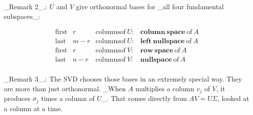_Remark 2_.: \(U\) and \(V\) give orthonormal bases for _all four fundamental subspaces_:

\[\begin{array}{llll}\mathrm{first}&r&\mathrm{columns of}\ U\mathrm{:}& \mathbf{column\ space}\ \mathrm{of}\ A\\ \mathrm{last}&m-r&\mathrm{columns of}\ U\mathrm{:}&\mathbf{left\ nullspace}\ \mathrm{of}\ A\\ \mathrm{first}&r&\mathrm{columns of}\ V\mathrm{:}&\mathbf{row\ space}\ \mathrm{of}\ A\\ \mathrm{last}&n-r&\mathrm{columns of}\ V\mathrm{:}&\mathbf{nullspace}\ \mathrm{of}\ A\\ \end{array}\]

_Remark 3_.: The SVD chooses those bases in an extremely special way. They are more than just orthonormal. _When \(A\) multiplies a column \(v_{j}\) of \(V\), it produces \(\sigma_{j}\) times a column of \(U\)_. That comes directly from \(AV=U\Sigma\), looked at a column at a time.

